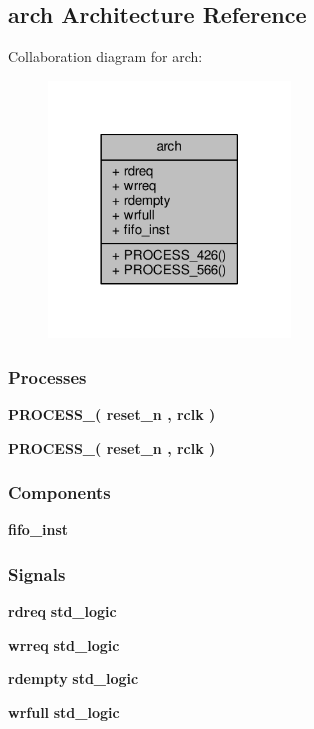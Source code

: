\subsection{arch Architecture Reference}
\label{classsync__fifo__rw_1_1arch}


Collaboration diagram for arch\+:\nopagebreak
\begin{figure}[H]
\begin{center}
\leavevmode
\includegraphics[width=182pt]{d8/da3/classsync__fifo__rw_1_1arch__coll__graph}
\end{center}
\end{figure}
\subsubsection*{Processes}
 \begin{DoxyCompactItemize}
\item 
{\bf P\+R\+O\+C\+E\+S\+S\+\_}{\bfseries  ( {\bfseries {\bfseries {\bf reset\+\_\+n}} \textcolor{vhdlchar}{ }} , {\bfseries {\bfseries {\bf rclk}} \textcolor{vhdlchar}{ }} )}
\item 
{\bf P\+R\+O\+C\+E\+S\+S\+\_}{\bfseries  ( {\bfseries {\bfseries {\bf reset\+\_\+n}} \textcolor{vhdlchar}{ }} , {\bfseries {\bfseries {\bf rclk}} \textcolor{vhdlchar}{ }} )}
\end{DoxyCompactItemize}
\subsubsection*{Components}
 \begin{DoxyCompactItemize}
\item 
{\bf fifo\+\_\+inst}  {\bfseries }  
\end{DoxyCompactItemize}
\subsubsection*{Signals}
 \begin{DoxyCompactItemize}
\item 
{\bf rdreq} {\bfseries \textcolor{comment}{std\+\_\+logic}\textcolor{vhdlchar}{ }} 
\item 
{\bf wrreq} {\bfseries \textcolor{comment}{std\+\_\+logic}\textcolor{vhdlchar}{ }} 
\item 
{\bf rdempty} {\bfseries \textcolor{comment}{std\+\_\+logic}\textcolor{vhdlchar}{ }} 
\item 
{\bf wrfull} {\bfseries \textcolor{comment}{std\+\_\+logic}\textcolor{vhdlchar}{ }} 
\end{DoxyCompactItemize}
